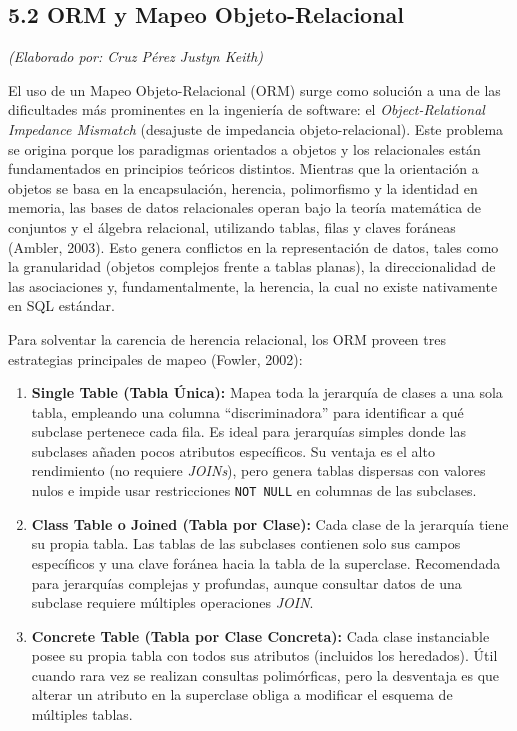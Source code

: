 \documentclass[12pt]{article}
\begin{document}
	\subsection{5.2 ORM y Mapeo Objeto-Relacional}
	\textit{(Elaborado por: Cruz Pérez Justyn Keith)}
	
	El uso de un Mapeo Objeto-Relacional (ORM) surge como solución a una de las dificultades más prominentes en la ingeniería de software: el \textit{Object-Relational Impedance Mismatch} (desajuste de impedancia objeto-relacional). Este problema se origina porque los paradigmas orientados a objetos y los relacionales están fundamentados en principios teóricos distintos. Mientras que la orientación a objetos se basa en la encapsulación, herencia, polimorfismo y la identidad en memoria, las bases de datos relacionales operan bajo la teoría matemática de conjuntos y el álgebra relacional, utilizando tablas, filas y claves foráneas (Ambler, 2003). Esto genera conflictos en la representación de datos, tales como la granularidad (objetos complejos frente a tablas planas), la direccionalidad de las asociaciones y, fundamentalmente, la herencia, la cual no existe nativamente en SQL estándar.
	
	Para solventar la carencia de herencia relacional, los ORM proveen tres estrategias principales de mapeo (Fowler, 2002):
	
	\begin{enumerate}
		\item \textbf{Single Table (Tabla Única):} Mapea toda la jerarquía de clases a una sola tabla, empleando una columna ``discriminadora'' para identificar a qué subclase pertenece cada fila. Es ideal para jerarquías simples donde las subclases añaden pocos atributos específicos. Su ventaja es el alto rendimiento (no requiere \textit{JOINs}), pero genera tablas dispersas con valores nulos e impide usar restricciones \texttt{NOT NULL} en columnas de las subclases.
		
		\item \textbf{Class Table o Joined (Tabla por Clase):} Cada clase de la jerarquía tiene su propia tabla. Las tablas de las subclases contienen solo sus campos específicos y una clave foránea hacia la tabla de la superclase. Recomendada para jerarquías complejas y profundas, aunque consultar datos de una subclase requiere múltiples operaciones \textit{JOIN}.
		
		\item \textbf{Concrete Table (Tabla por Clase Concreta):} Cada clase instanciable posee su propia tabla con todos sus atributos (incluidos los heredados). Útil cuando rara vez se realizan consultas polimórficas, pero la desventaja es que alterar un atributo en la superclase obliga a modificar el esquema de múltiples tablas.
	\end{enumerate}
	
\end{document}
